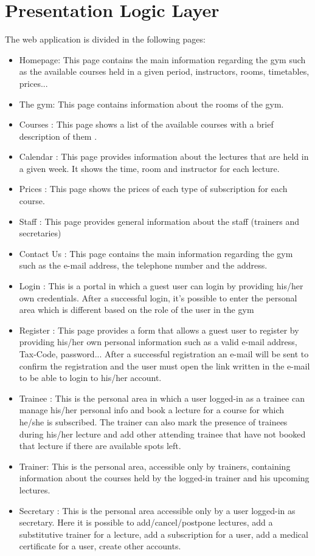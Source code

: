 \section{Presentation Logic Layer}


The web application is divided in the following pages:
\begin{itemize}
	\item Homepage: This page contains the main information regarding the gym such as the available courses held in a given period, instructors, rooms, timetables, prices...
	\item The gym: This page contains information about the rooms of the gym.
	\item Courses : This page shows a list of the available courses with a brief description of them .
	\item Calendar : This page provides information about the lectures that are held in a given week. It shows the time, room and instructor for each lecture.
	\item Prices : This page shows the prices of each type of subscription for each course.
	\item Staff : This page provides general information about the staff (trainers and secretaries)
	\item Contact Us : This page contains the main information regarding the gym such as the e-mail address, the telephone number and the address.
	\item Login : This is a portal in which a guest user can login by providing his/her own credentials. After a successful login, it's possible to enter the personal area which is different based on the role of the user in the gym
	\item Register : This page provides a form that allows a guest user to register by providing his/her own personal information such as a valid e-mail address, Tax-Code, password... After a successful registration an e-mail will be sent to confirm the registration and the user must open the link written in the e-mail to be able to login to his/her account.
	\item Trainee : This is the personal area in which a user logged-in as a trainee can manage his/her personal info and book a lecture for a course for which he/she is subscribed. The trainer can also mark the presence of trainees during his/her lecture and add other attending trainee that have not booked that lecture if there are available spots left.
	\item Trainer: This  is the personal area, accessible only by trainers, containing information about the courses held by the logged-in trainer and his upcoming lectures.
	\item Secretary : This is the personal area accessible only by a user logged-in as secretary. Here it is possible to add/cancel/postpone lectures, add a substitutive trainer for a lecture, add a subscription for a user, add a medical certificate for a user, create other accounts.
\end{itemize}

